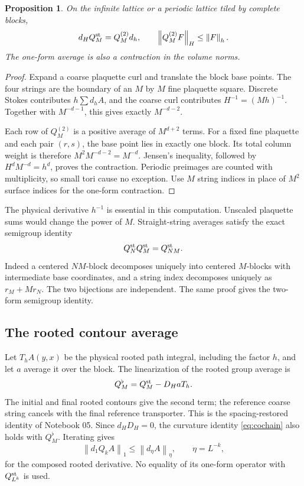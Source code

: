 \documentclass[11pt]{article}
\newtheorem{proposition}[theorem]{Proposition}
\theoremstyle{remark}
\newcommand{\norm}[1]{\left\|#1\right\|}
\begin{document}
\begin{proposition}\label{prop:cochain}
On the infinite lattice or a periodic lattice tiled by complete blocks,
\begin{equation}\label{eq:cochain}
 d_HQ_M^{\rm st}=Q_M^{(2)}d_h,\qquad
 \norm{Q_M^{(2)}F}_H\le\norm F_h.
\end{equation}
The one-form average is also a contraction in the volume norms.
\end{proposition}

\begin{proof}
Expand a coarse plaquette curl and translate the block base points.
The four strings are the boundary of an $M$ by $M$ fine plaquette
square. Discrete Stokes contributes $h\sum d_hA$, and the coarse
curl contributes $H^{-1}=(Mh)^{-1}$. Together with $M^{-d-1}$,
this gives exactly $M^{-d-2}$.

Each row of $Q_M^{(2)}$ is a positive average of $M^{d+2}$ terms.
For a fixed fine plaquette and each pair $(r,s)$, the base point lies
in exactly one block. Its total column weight is therefore
$M^2M^{-d-2}=M^{-d}$. Jensen's inequality, followed by
$H^dM^{-d}=h^d$, proves the contraction. Periodic preimages are
counted with multiplicity, so small tori cause no exception.
Use $M$ string indices in place of $M^2$ surface indices for the
one-form contraction.
\end{proof}

The physical derivative $h^{-1}$ is essential in this computation.
Unscaled plaquette sums would change the power of $M$.
Straight-string averages satisfy the exact semigroup identity
\[
 Q_N^{\rm st}Q_M^{\rm st}=Q_{NM}^{\rm st}.
\]
Indeed a centered $NM$-block decomposes uniquely into centered
$M$-blocks with intermediate base coordinates, and a string index
decomposes uniquely as $r_M+Mr_N$. The two bijections are independent.
The same proof gives the two-form semigroup identity.

\subsection{The rooted contour average}

Let $T_hA(y,x)$ be the physical rooted path integral, including the
factor $h$, and let $a$ average it over the block. The linearization
of the rooted group average is
\begin{equation}\label{eq:rooted}
 Q_M^\flat=Q_M^{\rm st}-D_HaT_h.
\end{equation}
The initial and final rooted contours give the second term; the
reference coarse string cancels with the final reference transporter.
This is the spacing-restored identity of Notebook 05. Since
$d_HD_H=0$, the curvature identity \eqref{eq:cochain} also holds
with $Q_M^\flat$. Iterating gives
\begin{equation}\label{eq:iterated-contraction}
 \norm{d_1Q_kA}_1\le\norm{d_\eta A}_\eta,
 \qquad \eta=L^{-k},
\end{equation}
for the composed rooted derivative. No equality of its one-form
operator with $Q_{L^k}^{\rm st}$ is used.
\end{document}
